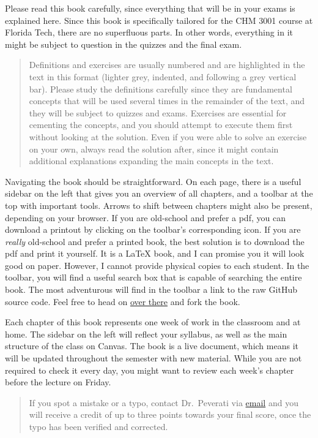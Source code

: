 \documentclass[
]{book}
\theoremstyle{definition}
\theoremstyle{definition}
\theoremstyle{definition}
\theoremstyle{remark}
\begin{document}
Please read this book carefully, since everything that will be in your exams is explained here.
Since this book is specifically tailored for the CHM 3001 course at Florida Tech, there are no superfluous parts. In other words, everything in it might be subject to question in the quizzes and the final exam.

\begin{quote}
Definitions and exercises are usually numbered and are highlighted in the text in this format (lighter grey, indented, and following a grey vertical bar). Please study the definitions carefully since they are fundamental concepts that will be used several times in the remainder of the text, and they will be subject to quizzes and exams. Exercises are essential for cementing the concepts, and you should attempt to execute them first without looking at the solution. Even if you were able to solve an exercise on your own, always read the solution after, since it might contain additional explanations expanding the main concepts in the text.
\end{quote}

Navigating the book should be straightforward. On each page, there is a useful sidebar on the left that gives you an overview of all chapters, and a toolbar at the top with important tools. Arrows to shift between chapters might also be present, depending on your browser. If you are old-school and prefer a pdf, you can download a printout by clicking on the toolbar's corresponding icon. If you are \emph{really} old-school and prefer a printed book, the best solution is to download the pdf and print it yourself. It is a LaTeX book, and I can promise you it will look good on paper. However, I cannot provide physical copies to each student. In the toolbar, you will find a useful search box that is capable of searching the entire book. The most adventurous will find in the toolbar a link to the raw GitHub source code. Feel free to head on \href{https://github.com/peverati/PChem1}{over there} and fork the book.

Each chapter of this book represents one week of work in the classroom and at home. The sidebar on the left will reflect your syllabus, as well as the main structure of the class on Canvas. The book is a live document, which means it will be updated throughout the semester with new material. While you are not required to check it every day, you might want to review each week's chapter before the lecture on Friday.

\begin{quote}
If you spot a mistake or a typo, contact Dr.~Peverati via \href{mailto:rpeverati@fit.edu}{email} and you will receive a credit of up to three points towards your final score, once the typo has been verified and corrected.
\end{quote}
\end{document}
